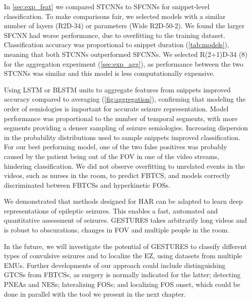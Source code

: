 In \cref{sec:exp_feat} we compared \acp{STCNN} to \acp{SFCNN} for snippet-level classification.
To make comparisons fair, we selected models with a similar number of layers (R2D-34) or parameters (Wide R2D-50-2).
We found the larger \ac{SFCNN} had worse performance, due to overfitting to the training dataset.
Classification accuracy was proportional to snippet duration (\cref{tab:models}), meaning that both \acp{STCNN} outperformed \acp{SFCNN}.
We selected R(2+1)D-34 (8) for the aggregation experiment (\cref{sec:exp_agg}), as performance between the two \acp{STCNN} was similar and this model is less computationally expensive.

Using \ac{LSTM} or \ac{BLSTM} units to aggregate features from snippets improved accuracy compared to averaging (\cref{fig:aggregation}), confirming that modeling the order of semiologies is important for accurate seizure representation.
Model performance was proportional to the number of temporal segments, with more segments providing a denser sampling of seizure semiologies. %
Increasing dispersion in the probability distributions used to sample snippets improved classification.
For our best performing model, one of the two false positives was probably caused by the patient being out of the \ac{FOV} in one of the video streams, hindering classification.
We did not observe overfitting to unrelated events in the videos, such as nurses in the room, to predict \ac{FBTCS}, and models correctly discriminated between \acp{FBTCS} and hyperkinetic \acp{FOS}.

We demonstrated that methods designed for \ac{HAR} can be adapted to learn deep representations of epileptic seizures.
This enables a fast, automated and quantitative assessment of seizures.
\Ac{GESTURES} takes arbitrarily long videos and is robust to obscurations, changes in \ac{FOV} and multiple people in the room.

In the future, we will investigate the potential of \ac{GESTURES} to classify different types of convulsive seizures and to localize the \ac{EZ}, using datasets from multiple \acp{EMU}.
Further developments of our approach could include
distinguishing \acp{GTCS} from \acp{FBTCS}, as surgery is normally indicated for the latter;
detecting \acp{PNEA} and \acp{NES};
lateralizing \acp{FOS};
and localizing \ac{FOS} onset, which could be done in parallel with the tool we present in the next chapter.
